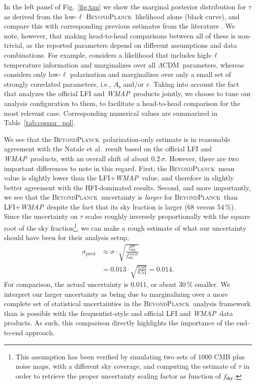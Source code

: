 \documentclass[twocolumn]{aa}
\def\WMAP{\textit{WMAP}}
\def\LCDM{$\Lambda$CDM}
\newcommand{\BP}{\textsc{BeyondPlanck}}
\begin{document}
In the left panel of Fig.~\ref{fig:tau} we show the marginal posterior
distribution for $\tau$ as derived from the low-$\ell$ \BP\ likelihood
alone (black curve), and compare this with corresponding previous
estimates from the literature \citep{hinshaw2012, planck2016-l06,
  natale:2020,pagano:2020}. We note, however, that making head-to-head
comparisons between all of these is non-trivial, as the reported
parameters depend on different assumptions and data combinations. For
example, \citet{pagano:2020} considers a likelihood that includes
high-$\ell$ temperature information and marginalizes over all
\LCDM\ parameters, whereas \citet{natale:2020} considers only
low-$\ell$ polarization and marginalizes over only a small set of
strongly correlated parameters, i.e., $A_{\mathrm{s}}$ and/or
$r$. Taking into account the fact that \citet{natale:2020} analyzes
the official LFI and \WMAP\ products jointly, we choose to tune our
analysis configuration to them, to facilitate a head-to-head
comparison for the most relevant case. Corresponding numerical values
are summarized in Table~\ref{tab:cospar_pol}.

We see that the \BP\ polarization-only estimate is in reasonable
agreement with the Natale et al.\ result based on the official LFI and
\WMAP\ products, with an overall shift of about
$0.2\,\sigma$. However, there are two important differences to note in
this regard. First, the \BP\ mean value is slightly lower than the
LFI+\WMAP\ value, and therefore in slightly better agreement with the
HFI-dominated results. Second, and more importantly, we see that the
\BP\ uncertainty is \emph{larger} for \BP\ than LFI+\WMAP\, despite
the fact that its sky fraction is larger (68 versus 54\,\%). Since the
uncertainty on $\tau$ scales roughly inversely proportionally with the
square root of the sky fraction\footnote{This assumption has been verified
by simulating two sets of $1000$ CMB plus noise maps, with a different
sky coverage, and computing the estimate of $\tau$ in order to retrieve
the proper uncertainty scaling factor as function of $f_{\rm{sky}}$.}, we can
make a rough estimate of what our uncertainty should have been for
their analysis setup,
\begin{align}
  \sigma_{\mathrm{pred}} &\approx
  \sigma\cdot\sqrt{\frac{f_{\mathrm{sky}}^{\mathrm{BP}}}{f_{\mathrm{sky}}^{\mathrm{Natale}}}}\\\
  &= 0.013\cdot \sqrt{\frac{0.68}{0.54}}= 0.014.
\end{align}
For comparison, the actual \citet{natale:2020} uncertainty is 0.011, or about 30\,\%
smaller. We interpret our larger uncertainty as being due to marginalizing over a more
complete set of statistical uncertainties in the \BP\ analysis
framework than is possible with the frequentist-style and official LFI
and \WMAP\ data products. As such, this comparison directly highlights
the importance of the end-to-end approach.
\end{document}
